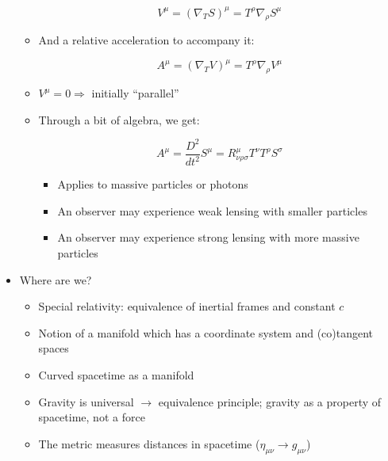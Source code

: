 \begin{itemize}
\begin{itemize}
        $$V^{\mu}=(\nabla_T S)^{\mu}=T^{\rho}\nabla_{\rho}S^{\mu}$$

      \item And a relative acceleration to accompany it:

        $$A^{\mu}=(\nabla_T V)^{\mu}=T^{\rho}\nabla_{\rho}V^{\mu}$$

      \item $V^{\mu}=0 \Rightarrow$ initially ``parallel''

      \item Through a bit of algebra, we get:

        $$A^{\mu}=\frac{D^2}{dt^2}S^{\mu}=R^{\mu}_{\nu\rho\sigma}T^{\nu}T^{\rho}S^{\sigma}$$

        \begin{itemize}

          \item Applies to massive particles or photons

          \item An observer may experience weak lensing with smaller particles

          \item An observer may experience strong lensing with more massive particles

        \end{itemize}

    \end{itemize}

  \item Where are we?

    \begin{itemize}

      \item Special relativity: equivalence of inertial frames and constant $c$

      \item Notion of a manifold which has a coordinate system and (co)tangent spaces

      \item Curved spacetime as a manifold

      \item Gravity is universal $\to$ equivalence principle; gravity as a property of spacetime, not a force

      \item The metric measures distances in spacetime ($\eta_{\mu\nu}\to g_{\mu\nu}$)

        \begin{itemize}


\end{itemize}
\end{itemize}
\end{itemize}
